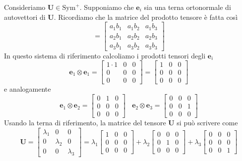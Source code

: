 \documentclass[10pt,a4paper,twoside]{book}
\begin{document}
Consideriamo $\mathbf{U} \in \mathrm{Sym}^{+}$. Supponiamo che $\mathbf{e}_{i}$ sia una terna ortonormale di autovettori di $\mathbf{U}$. Ricordiamo che la matrice del prodotto tensore è fatta così
\begin{equation*}
[\mathbf{a} \otimes \mathbf{b}] =\begin{bmatrix}
a_{1} b_{1} & a_{1} b_{2} & a_{1} b_{3}\\
a_{2} b_{1} & a_{2} b_{2} & a_{2} b_{3}\\
a_{3} b_{1} & a_{3} b_{2} & a_{3} b_{3}
\end{bmatrix}
\end{equation*}
In questo sistema di riferimento calcoliamo i prodotti tensori degli $\mathbf{e}_{i}$
\begin{equation*}
\mathbf{e}_{1} \otimes \mathbf{e}_{1} =\begin{bmatrix}
1\cdotp 1 & 0 & 0\\
0 & 0 & 0\\
0 & 0 & 0
\end{bmatrix} =\begin{bmatrix}
1 & 0 & 0\\
0 & 0 & 0\\
0 & 0 & 0
\end{bmatrix}
\end{equation*}
e analogamente
\begin{equation*}
\mathbf{e}_{1} \otimes \mathbf{e}_{2} =\begin{bmatrix}
0 & 1 & 0\\
0 & 0 & 0\\
0 & 0 & 0
\end{bmatrix} \ \ \ \ \mathbf{e}_{2} \otimes \mathbf{e}_{3} =\begin{bmatrix}
0 & 0 & 0\\
0 & 0 & 1\\
0 & 0 & 0
\end{bmatrix}
\end{equation*}
Usando la terna di riferimento, la matrice del tensore $\mathbf{U}$ si può scrivere come
\begin{equation*}
\mathbf{U} =\begin{bmatrix}
\lambda _{1} & 0 & 0\\
0 & \lambda _{2} & 0\\
0 & 0 & \lambda _{3}
\end{bmatrix} =\lambda _{1}\begin{bmatrix}
1 & 0 & 0\\
0 & 0 & 0\\
0 & 0 & 0
\end{bmatrix} +\lambda _{2}\begin{bmatrix}
0 & 0 & 0\\
0 & 1 & 0\\
0 & 0 & 0
\end{bmatrix} +\lambda _{3}\begin{bmatrix}
0 & 0 & 0\\
0 & 0 & 0\\
0 & 0 & 1
\end{bmatrix}
\end{equation*}
\end{document}
